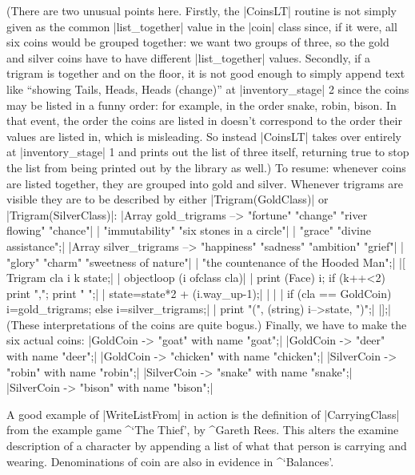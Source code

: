 {(There are two unusual points here.  Firstly, the |CoinsLT| routine
is not simply given as the common |list_together| value in the |coin|
class since, if it were, all six coins would be grouped together:
we want two groups of three, so the gold and silver coins have to have
different |list_together| values.  Secondly, if a trigram is together
and on the floor, it is not good enough to simply append text like
``showing Tails, Heads, Heads (change)'' at |inventory_stage| 2 since the
coins may be listed in a funny order: for example, in the order snake,
robin, bison.  In that event, the order the coins are listed in
doesn't correspond to the order their values are listed in, which is
misleading.  So instead |CoinsLT| takes over entirely at
|inventory_stage| 1 and prints out the list of three itself, returning
true to stop the list from being printed out by the library as well.)
To resume: whenever coins are listed together, they are grouped
into gold and silver.  Whenever trigrams are visible they are to be
described by either |Trigram(GoldClass)| or |Trigram(SilverClass)|:
\beginlines
|Array gold_trigrams -->   "fortune" "change" "river flowing" "chance"|
|                          "immutability" "six stones in a circle"|
|                          "grace" "divine assistance";|
|Array silver_trigrams --> "happiness" "sadness" "ambition" "grief"|
|                          "glory" "charm" "sweetness of nature"|
|                          "the countenance of the Hooded Man";|
|[ Trigram cla i k state;|
|  objectloop (i ofclass cla)|
|  {   print (Face) i; if (k++<2) print ","; print " ";|
|      state=state*2 + (i.way_up-1);|
|  }|
|  if (cla == GoldCoin) i=gold_trigrams; else i=silver_trigrams;|
|  print "(", (string) i-->state, ")";|
|];|
\endlines
(These interpretations of the coins are quite bogus.)  Finally,
we have to make the six actual coins:
\beginlines
|GoldCoin ->   "goat"    with name "goat";|
|GoldCoin ->   "deer"    with name "deer";|
|GoldCoin ->   "chicken" with name "chicken";|
|SilverCoin -> "robin"   with name "robin";|
|SilverCoin -> "snake"   with name "snake";|
|SilverCoin -> "bison"   with name "bison";|
\endlines}

\tenpoint

 A good example of |WriteListFrom| in action is the definition
of |CarryingClass| from the example game ^{`The Thief'}, by
^{Gareth Rees}.  This alters the examine description of a character
by appending a list of what that person is carrying and wearing.
\nextref Denominations of coin are also in evidence in ^{`Balances'}.


